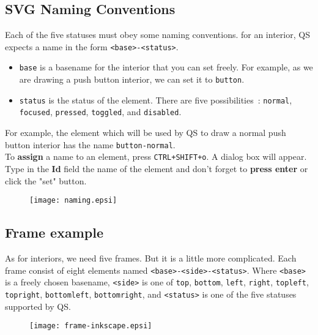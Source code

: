 \documentclass[a4paper,12pt]{report}
\begin{document}
\subsection{SVG Naming Conventions}
Each of the five statuses must obey some naming conventions. for an interior,
QS expects a name in the form \verb,<base>-<status>,.\\

\begin{itemize}
  \item \verb,base, is a basename for the interior that you can set freely. For
example, as we are drawing a push button interior, we can set it to
\verb,button,.\\
  \item \verb,status, is the status of the element. There are five
possibilities~: \verb,normal,, \verb,focused,, \verb,pressed,, \verb,toggled,,
and \verb,disabled,.
\end{itemize}

For example, the element which will be used by QS to draw a normal push button
interior has the name \verb,button-normal,.\\

To \textbf{assign} a name to an element, press \verb,CTRL+SHIFT+o,. A dialog
box will appear. Type in the \textbf{Id} field the name of the element and
don't forget to \textbf{press enter} or click the "set" button.\\

\begin{figure}[hbtp]
  \centering
  \texttt{[image: naming.epsi]}
\end{figure}

\subsection{Frame example}
As for interiors, we need five frames. But it is a little more complicated.
Each frame consist of eight elements named \verb,<base>-<side>-<status>,. Where
\verb,<base>, is a freely chosen basename, \verb,<side>, is one of \verb,top,,
\verb,bottom,, \verb,left,, \verb,right,, \verb,topleft,, \verb,topright,,
\verb,bottomleft,, \verb,bottomright,, and \verb,<status>, is one of the five
statuses supported by QS.\\

\begin{figure}[hbtp]
  \centering
  \texttt{[image: frame-inkscape.epsi]}
\end{figure}
\end{document}
